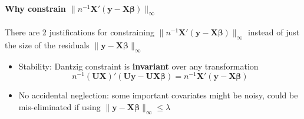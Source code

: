 \documentclass[twoside]{article}
\begin{document}
\paragraph*{Why constrain $\lVert n^{-1}\mathbf{X}'(\mathbf{y}-\mathbf{X}\boldsymbol{\beta}) \rVert _{\infty}$} There are 2 justifications for constraining $\lVert n^{-1}\mathbf{X}'(\mathbf{y}-\mathbf{X}\boldsymbol{\beta}) \rVert _{\infty}$ instead of just the size of the residuals $\lVert\mathbf{y}-\mathbf{X}\boldsymbol{\beta} \rVert _{\infty}$
\begin{itemize}
    \item Stability: Dantzig constraint is \textbf{invariant} over any  transformation $$ n^{-1}(\mathbf{UX})'(\mathbf{Uy}-\mathbf{UX}\boldsymbol{\beta}) = n^{-1}\mathbf{X}'(\mathbf{y}-\mathbf{X}\boldsymbol{\beta}) $$
    \item No accidental neglection: some important covariates might be noisy, could be mis-eliminated if using $\lVert \mathbf{y}-\mathbf{X}\boldsymbol{\beta} \rVert _{\infty} \leq \lambda$
\end{itemize}
\end{document}
